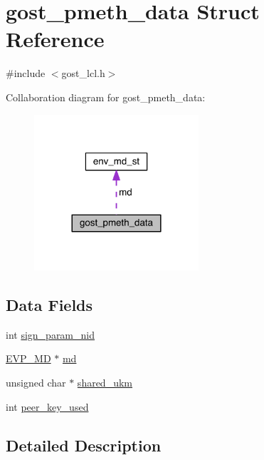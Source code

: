 \hypertarget{structgost__pmeth__data}{}\section{gost\+\_\+pmeth\+\_\+data Struct Reference}
\label{structgost__pmeth__data}


{\ttfamily \#include $<$gost\+\_\+lcl.\+h$>$}



Collaboration diagram for gost\+\_\+pmeth\+\_\+data\+:\nopagebreak
\begin{figure}[H]
\begin{center}
\leavevmode
\includegraphics[width=173pt]{structgost__pmeth__data__coll__graph}
\end{center}
\end{figure}
\subsection*{Data Fields}
\begin{DoxyCompactItemize}
\item 
int \hyperlink{structgost__pmeth__data_a1d2fcf88413c158542b3febee6f210df}{sign\+\_\+param\+\_\+nid}
\item 
\hyperlink{crypto_2ossl__typ_8h_aac66cf010326fa9a927c2a34888f45d3}{E\+V\+P\+\_\+\+MD} $\ast$ \hyperlink{structgost__pmeth__data_a53c8a7a6089e9083cf1822014950084d}{md}
\item 
unsigned char $\ast$ \hyperlink{structgost__pmeth__data_a4a3eaf7e14ed79d59fcdd401db2f1b10}{shared\+\_\+ukm}
\item 
int \hyperlink{structgost__pmeth__data_a05b0f387cc19262e7e548ba85b6cb651}{peer\+\_\+key\+\_\+used}
\end{DoxyCompactItemize}


\subsection{Detailed Description}


